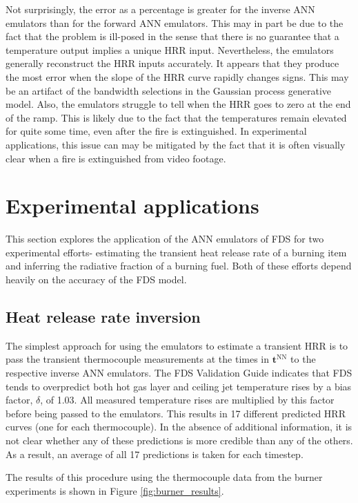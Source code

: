 \documentclass{article}
\begin{document}
Not surprisingly, the error as a percentage is greater for the inverse ANN emulators than for the forward ANN emulators. This may in part be due to the fact that the problem is ill-posed in the sense that there is no guarantee that a temperature output implies a unique HRR input. Nevertheless, the emulators generally reconstruct the HRR inputs accurately. It appears that they produce the most error when the slope of the HRR curve rapidly changes signs. This may be an artifact of the bandwidth selections in the Gaussian process generative model. Also, the emulators struggle to tell when the HRR goes to zero at the end of the ramp. This is likely due to the fact that the temperatures remain elevated for quite some time, even after the fire is extinguished. In experimental applications, this issue can may be mitigated by the fact that it is often visually clear when a fire is extinguished from video footage.

\section{Experimental applications}
This section explores the application of the ANN emulators of FDS for two experimental efforts- estimating the transient heat release rate of a burning item and inferring the radiative fraction of a burning fuel. Both of these efforts depend heavily on the accuracy of the FDS model. 

\subsection{Heat release rate inversion}
The simplest approach for using the emulators to estimate a transient HRR is to pass the transient thermocouple measurements at the times in $\boldsymbol{t}^\text{NN}$ to the respective inverse ANN emulators. The FDS Validation Guide \cite{mcgrattan2020fire} indicates that FDS tends to overpredict both hot gas layer and ceiling jet temperature rises by a bias factor, $\delta$, of 1.03. All measured temperature rises are multiplied by this factor before being passed to the emulators. This results in 17 different predicted HRR curves (one for each thermocouple). In the absence of additional information, it is not clear whether any of these predictions is more credible than any of the others. As a result, an average of all 17 predictions is taken for each timestep. 

The results of this procedure using the thermocouple data from the burner experiments is shown in Figure \ref{fig:burner_results}.
\end{document}
